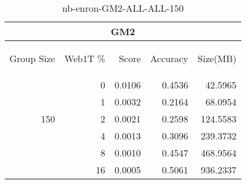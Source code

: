 \begin{center}
\begin{table}[htbp] 
 \begin{center}
\begin{tabular}{ | r | r | r | r | r |}
\hline
\multicolumn{5}{|c|}{GM2}\\
\hline
\begin{sideways}Group Size\end{sideways} & \begin{sideways}Web1T \%\end{sideways} & \begin{sideways}Score\end{sideways} & \begin{sideways}Accuracy\end{sideways} & \begin{sideways}Size(MB)\end{sideways}\\
\hline
\multirow{5}{*}{150}
 & 0 & 0.0106 & 0.4536 & 42.5965\\ \cline{2-5}
 & 1 & 0.0032 & 0.2164 & 68.0954\\ \cline{2-5}
 & 2 & 0.0021 & 0.2598 & 124.5583\\ \cline{2-5}
 & 4 & 0.0013 & 0.3096 & 239.3732\\ \cline{2-5}
 & 8 & 0.0010 & 0.4547 & 468.9564\\ \cline{2-5}
 & 16 & 0.0005 & 0.5061 & 936.2337\\ \cline{2-5}
\hline
\end{tabular}
\caption{nb-enron-GM2-ALL-ALL-150}
\label{table:nb-enron-GM2-ALL-ALL-150}
\end{center}
 \end{table}
\end{center}


